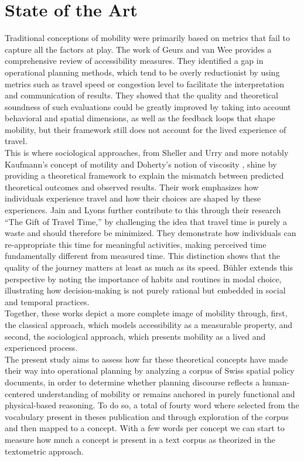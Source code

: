 \section{State of the Art}
Traditional conceptions of mobility were primarily based on metrics that fail to capture all the factors at play. The work of Geurs and van Wee \cite{geurs_accessibility_2004} provides a comprehensive review of accessibility measures. They identified a gap in operational planning methods, which tend to be overly reductionist by using metrics such as travel speed or congestion level to facilitate the interpretation and communication of results. They showed that the quality and theoretical soundness of such evaluations could be greatly improved by taking into account behavioral and spatial dimensions, as well as the feedback loops that shape mobility, but their framework still does not account for the lived experience of travel.\\

This is where sociological approaches, from Sheller and Urry \cite{sheller_new_2006} and more notably Kaufmann's concept of motility \cite{kaufmann_motility_2004} and Doherty's notion of viscosity \cite{doherty_agentive_2015}, shine by providing a theoretical framework to explain the mismatch between predicted theoretical outcomes and observed results. Their work emphasizes how individuals experience travel and how their choices are shaped by these experiences. Jain and Lyons \cite{jain_gift_2008} further contribute to this through their research “The Gift of Travel Time,” by challenging the idea that travel time is purely a waste and should therefore be minimized. They demonstrate how individuals can re-appropriate this time for meaningful activities, making perceived time fundamentally different from measured time. This distinction shows that the quality of the journey matters at least as much as its speed. Bühler \cite{buhler_habit_2020} extends this perspective by noting the importance of habits and routines in modal choice, illustrating how decision-making is not purely rational but embedded in social and temporal practices.\\

Together, these works depict a more complete image of mobility through, first, the classical approach, which models accessibility as a measurable property, and second, the sociological approach, which presents mobility as a lived and experienced process.\\

The present study aims to assess how far these theoretical concepts have made their way into operational planning by analyzing a corpus of Swiss spatial policy documents, in order to determine whether planning discourse reflects a human-centered understanding of mobility or remains anchored in purely functional and physical-based reasoning. To do so, a total of fourty word where selected from the vocabulary present in theses publication and through exploration of the corpus and then mapped to a concept. With a few words per concept we can start to measure how much a concept is present in a text corpus as theorized in the textometric approach.\\